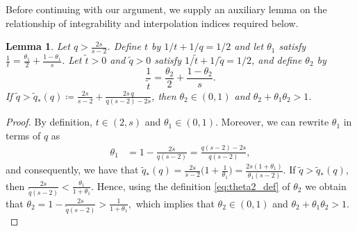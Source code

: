 \documentclass[11pt]{article}
\newtheorem{lemma}[theorem]{Lemma}
\theoremstyle{definition}
\theoremstyle{remark}
\begin{document}
%
Before continuing with our argument, we supply an auxiliary lemma
on the relationship of integrability and interpolation indices
required below.
%
\begin{lemma}\label{lem:exponent_condition}
Let $q>\frac{2s}{s-2}$. Define $t$ by
$1/t+1/q=1/2$ and let $\theta_1$ satisfy
$\displaystyle
\frac1t=\frac{\theta_1}{2}+\frac{1-\theta_1}{s} \label{theta1}$. 
Let $\tilde t > 0 $ and $\tilde q > 0$ satisfy $1/{\tilde t}+1/{\tilde q}=1/2$,
and define $\theta_2$ by
\begin{equation}\label{eq:theta2_def}
\frac1{\tilde t}
=
\frac{\theta_2}{2}+\frac{1-\theta_2}{s}.
\end{equation}
If $\tilde q
> \tilde{q}_*(q) \coloneqq
\frac{2s}{s-2}
+
\frac{2s\,q}{q(s-2)-2s}$, then $\theta_2 \in (0,1)$ and $\theta_2+\theta_1\theta_2>1$. 
\end{lemma}
\begin{proof}
By definition, $t \in (2,s)$ and $\theta_1 \in (0,1)$.  
Moreover, we can rewrite $\theta_1$ in terms of $q$ as
\begin{align}
\theta_1
&=
1-\frac{2s}{q(s-2)} = \frac{q(s-2)-2s}{q(s-2)}, 
\label{eq:theta1_formula}
\end{align}
and consequently, we have that 
$ \tilde{q}_*(q) = \frac{2s}{s-2}\Big(1 + \frac{1}{\theta_1}\Big) = \frac{2s(1+\theta_1)}
{\theta_1(s-2)}.$
If $\tilde q > \tilde{q}_*(q)$, then $ 
\frac{2s}{\tilde q(s-2)}
<
\frac{\theta_1}{1+\theta_1}$.
Hence, using the definition \eqref{eq:theta2_def} of $\theta_2$ we obtain that $
\theta_2
=
1-\frac{2s}{\tilde q(s-2)} > \frac1{1+\theta_1},$ which implies that $\theta_2 \in (0,1)$ and $\theta_2+\theta_1\theta_2>1.$







\end{proof} 
\end{document}
